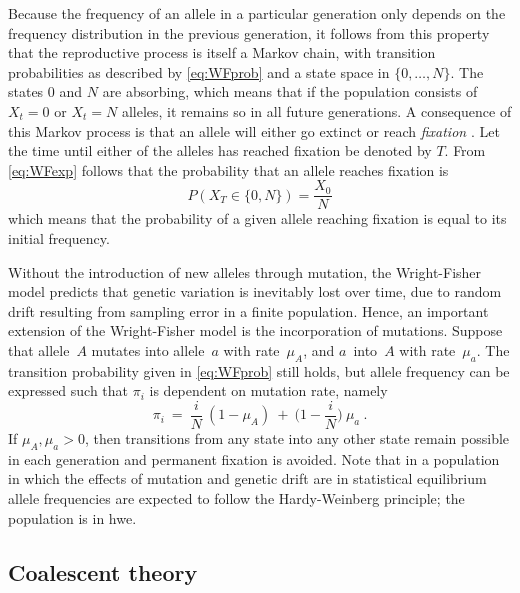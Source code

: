 %

%

Because the frequency of an allele in a particular generation only depends on the frequency distribution in the previous generation, it follows from this property that the reproductive process is itself a Markov chain, with transition probabilities as described by \cref{eq:WFprob} and a state space in $\{0,\ldots,N\}$.
The states $0$ and $N$ are absorbing, which means that if the population consists of ${X_t=0}$ or ${X_t=N}$ alleles, it remains so in all future generations.
A consequence of this Markov process is that an allele will either go extinct or reach \emph{fixation} \citep[\eg, see][]{ewens2012}.
Let the time until either of the  alleles has reached fixation be denoted by $T$.
From \cref{eq:WFexp} follows that the probability that an allele reaches fixation is
\begin{equation}
	P(X_T \in \{0,N\}) = \frac{X_0}{N}
\end{equation}
which means that the probability of a given allele reaching fixation is equal to its initial frequency.

Without the introduction of new alleles through mutation, the Wright-Fisher model predicts that genetic variation is inevitably lost over time, due to random drift resulting from sampling error in a finite population. \label{ref:mutgendiv}
Hence, an important extension of the Wright-Fisher model is the incorporation of mutations.
Suppose that allele~$A$ mutates into allele~$a$ with rate~$\mu_A$, and $a$~into~$A$ with rate~$\mu_a$.
The transition probability given in \cref{eq:WFprob} still holds, but allele frequency can be expressed such that $\pi_i$ is dependent on mutation rate, namely
\begin{equation}
	\pi_i ~=~ \frac{i}{N} ~ (1 - \mu_A) ~+~ \Big( 1 - \frac{i}{N} \Big) ~ \mu_a \ .
\end{equation}
If ${\mu_A, \mu_a > 0}$, then transitions from any state into any other state remain possible in each generation and permanent  fixation is avoided.
Note that in a population in which the effects of mutation and genetic drift are in statistical equilibrium allele frequencies are expected to follow the Hardy-Weinberg principle; \ie the population is in \gls{hwe}.


%
\subsection{Coalescent theory}
\label{sec:coalescent}
%


